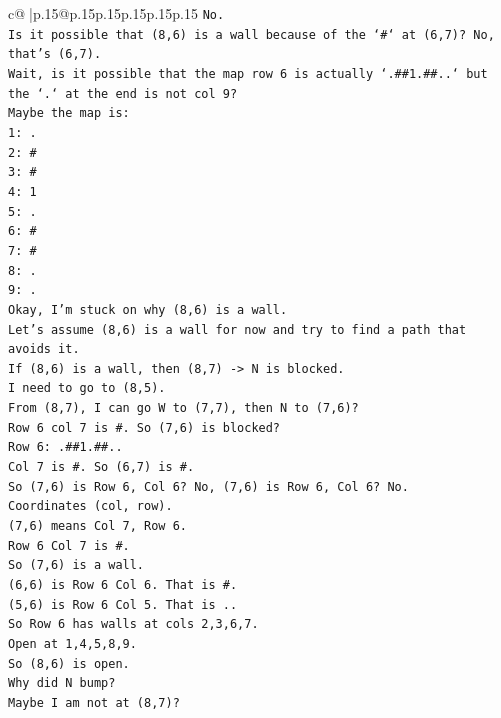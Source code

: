 \documentclass{article}
\begin{document}
{\begin{supertabular}{c@{$\;$}|p{.15\linewidth}@{}p{.15\linewidth}p{.15\linewidth}p{.15\linewidth}p{.15\linewidth}p{.15\linewidth}}
{{{\texttt{No.} \\
\texttt{Is it possible that (8,6) is a wall because of the `\#` at (6,7)? No, that's (6,7).} \\
\texttt{Wait, is it possible that the map row 6 is actually `.\#\#1.\#\#..` but the `.` at the end is not col 9?} \\
\texttt{Maybe the map is:} \\
\texttt{1: .} \\
\texttt{2: \#} \\
\texttt{3: \#} \\
\texttt{4: 1} \\
\texttt{5: .} \\
\texttt{6: \#} \\
\texttt{7: \#} \\
\texttt{8: .} \\
\texttt{9: .} \\
\texttt{Okay, I'm stuck on why (8,6) is a wall.} \\
\texttt{Let's assume (8,6) is a wall for now and try to find a path that avoids it.} \\
\texttt{If (8,6) is a wall, then (8,7) {-}> N is blocked.} \\
\texttt{I need to go to (8,5).} \\
\texttt{From (8,7), I can go W to (7,7), then N to (7,6)?} \\
\texttt{Row 6 col 7 is \#. So (7,6) is blocked?} \\
\texttt{Row 6: .\#\#1.\#\#..} \\
\texttt{Col 7 is \#. So (6,7) is \#.} \\
\texttt{So (7,6) is Row 6, Col 6? No, (7,6) is Row 6, Col 6? No.} \\
\texttt{Coordinates (col, row).} \\
\texttt{(7,6) means Col 7, Row 6.} \\
\texttt{Row 6 Col 7 is \#.} \\
\texttt{So (7,6) is a wall.} \\
\texttt{(6,6) is Row 6 Col 6. That is \#.} \\
\texttt{(5,6) is Row 6 Col 5. That is ..} \\
\texttt{So Row 6 has walls at cols 2,3,6,7.} \\
\texttt{Open at 1,4,5,8,9.} \\
\texttt{So (8,6) is open.} \\
\texttt{Why did N bump?} \\
\texttt{Maybe I am not at (8,7)?} \\
}}}
\end{supertabular}}
\end{document}
